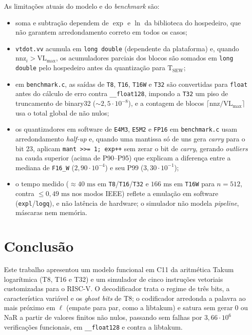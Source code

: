 \documentclass[journal]{IEEEtran}
\begin{document}
As limitações atuais do modelo e do \emph{benchmark} são:
\begin{itemize}
\item soma e subtração dependem de $\exp$ e $\ln$ da biblioteca do
hospedeiro, que não garantem arredondamento correto em todos os casos;
\item \texttt{vtdot.vv} acumula em \texttt{long double} (dependente da
plataforma) e, quando $\mathrm{nnz}_i > \mathrm{VL}_{\max}$, os acumuladores
parciais dos blocos são somados em \texttt{long double} pelo hospedeiro antes
da quantização para $\mathrm{T}_{\mathrm{SEW}}$;
\item em \texttt{benchmark.c}, as saídas de \texttt{T8}, \texttt{T16},
\texttt{T16W} e \texttt{T32} são convertidas para \texttt{float} antes do
cálculo de erro contra \texttt{\_\_float128}, impondo a \texttt{T32} um piso de
truncamento de binary32 ($\sim 2{,}5\cdot 10^{-8}$), e a contagem de blocos
$\lceil\mathrm{nnz}/\mathrm{VL}_{\max}\rceil$ usa o total global de não nulos;
\item os quantizadores em software de \texttt{E4M3}, \texttt{E5M2} e
\texttt{FP16} em \texttt{benchmark.c} usam arredondamento \emph{half-up} e,
quando uma mantissa só de uns gera \emph{carry} para o bit 23, aplicam
\texttt{mant >{}>= 1; exp++} sem zerar o bit de \emph{carry}, gerando
\emph{outliers} na cauda superior (acima de P90--P95) que explicam a diferença
entre a mediana de \texttt{F16\_W} ($2{,}90\cdot 10^{-4}$) e seu P99
($3{,}30\cdot 10^{-1}$);
\item o tempo medido ($\approx 40\text{ ms}$ em \texttt{T8}/\texttt{T16}/\texttt{T32}
e $166\text{ ms}$ em \texttt{T16W} para $n=512$, contra $\le 0{,}49\text{ ms}$
nos modos IEEE) reflete a emulação em software (\texttt{expl}/\texttt{logq}), e
não latência de hardware; o simulador não modela \emph{pipeline}, máscaras nem
memória.
\end{itemize}

\section{Conclusão}
\label{sec:concl}

Este trabalho apresentou um modelo funcional em C11 da aritmética Takum
logarítmica (T8, T16 e T32) e um simulador de cinco instruções vetoriais
customizadas para o RISC-V. O decodificador trata o regime de três bits, a
característica variável e os \emph{ghost bits} de T8; o codificador arredonda a
palavra ao mais próximo em $\ell$ (empate para par, como a libtakum) e satura
sem gerar 0 ou NaR a partir de valores finitos não nulos, passando sem falhas
por $3{,}66\cdot 10^{6}$ verificações funcionais, em \texttt{\_\_float128} e
contra a libtakum.
\end{document}
